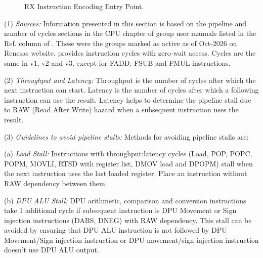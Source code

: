 \begin{figure}
\captionsetup{font=scriptsize, labelfont=scriptsize}
\caption{RX Instruction Encoding Entry Point.}
\end{figure}



\SOPNoteBody

(1) \emph{Sources:} %
Information presented in this section is based on the pipeline and number of cycles sections in the CPU chapter 
of group user manuals listed in the Ref. column of . These were the groups 
marked as active as of Oct-2026 on Renesas website.  provides instruction 
cycles with zero-wait access. Cycles are the same in v1, v2 and v3, except for FADD, FSUB and FMUL instructions.

(2) \emph{Throughput and Latency:} %
Throughput is the number of cycles after which the next instruction can start. Latency is the 
number of cycles after which a following instruction can use the result. Latency helps to
determine the pipeline stall due to RAW (Read After Write) hazard when a subsequent 
instruction uses the result. 

(3) \emph{Guidelines to avoid pipeline stalls:} %
Methods for avoiding pipeline stalls are:

    \leveltwo
    (a) \emph{Load Stall:} %
    Instructions with throughput:latency cycles (Load, POP, POPC, POPM, MOVLI, RTSD with register 
    list, DMOV load and DPOPM) stall when the next instruction uses the last loaded register.
    Place an instruction without RAW dependency between them. 

    (b) \emph{DPU ALU Stall:} %
    DPU arithmetic, comparison and conversion instructions take 1 additional cycle if 
    subsequent instruction is DPU Movement or Sign injection instructions (DABS, DNEG) with
    RAW dependency. This stall can be avoided by ensuring that DPU ALU instruction is not 
    followed by DPU Movement/Sign injection instruction or DPU movement/sign injection 
    instruction doesn't use DPU ALU output.


